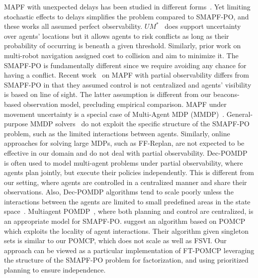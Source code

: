 \documentclass[letterpaper]{article}
\begin{document}
MAPF with unexpected delays has been studied in different forms~\cite{atzmon2020probabilistic,shahar2021safe,atzmon2020robust,ma2017multiAgent}. Yet limiting stochastic effects to delays simplifies the problem compared to SMAPF-PO, and these works all assumed perfect observability.
$UM^*$~\cite{wagner2017path} does support uncertainty over agents' locations but it allows agents to risk conflicts as long as their probability of occurring is beneath a given threshold. Similarly, prior work on multi-robot navigation assigned cost to collision and aim to minimize it.
The SMAPF-PO is fundamentally different since we require avoiding any chance for having a conflict. %
Recent work~\cite{davydov2021q} on MAPF with partial observability differs from SMAPF-PO in that they assumed control is not centralized and agents' visibility is based on line of sight. The latter assumption is different from our beacons-based observation model, precluding empirical comparison.  MAPF under movement uncertainty is a special case of Multi-Agent MDP (MMDP)~\cite{boutilier1996planning}.
General-purpose MMDP solvers~\cite{de2021constrained} do not exploit the specific structure of the SMAPF-PO problem, such as the limited interactions between agents. Similarly, online approaches for solving large MDPs, such as FF-Replan\cite{yoon2007ff}, are not expected to be effective in our domain and do not deal with partial observability.
Dec-POMDP~\cite{oliehoek2012decentralized} is often used to model multi-agent problems under partial observability, where agents plan jointly, but execute their policies independently.
This is different from our setting, where agents are controlled in a centralized manner and share their observations.
Also, Dec-POMDP algorithms tend to scale poorly unless the interactions between the agents are limited to small predefined areas in the state space~\cite{melo2009learning}.
Multiagent POMDP~\cite{oliehoek2017madp}, where both planning and control are centralized, is an appropriate model for SMAPF-PO.  \citet{amato2015scalable} suggest an algorithm based on POMCP which exploits the locality of agent interactions.
Their algorithm given singleton sets is similar to our POMCP, which does not scale as well as FSVI.
Our approach can be viewed as a particular implementation of FT-POMCP leveraging the structure of the SMAPF-PO problem for factorization, and using prioritized planning to ensure independence.
\end{document}
